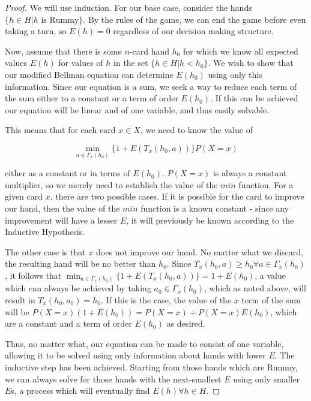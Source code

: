 \documentclass[letter,12pt]{article}
\begin{document}
\begin{proof}
We will use induction. For our base case, consider the hands $\{h \in H | h \textrm{ is Rummy}\}$. By the rules of the game, we can end the game before even taking a turn, so $E(h) = 0$ regardless of our decision making structure.

Now, assume that there is some $n$-card hand $h_0$ for which we know all expected values $E(h)$ for values of $h$ in the set $\{h \in H | h < h_0\}$. We wish to show that our modified Bellman equation can determine $E(h_0)$ using only this information. Since our equation is a sum, we seek a way to reduce each term of the sum either to a constant or a term of order $E(h_0)$. If this can be achieved our equation will be linear and of one variable, and thus easily solvable.

This means that for each card $x \in X$, we need to know the value of 

$$\min_{a \in \Gamma_x (h_0)}\{1+E(T_x(h_0,a))\} P(X=x)$$

either as a constant or in terms of $E(h_0)$. $P(X=x)$ is always a constant multiplier, so we merely need to establish the value of the $min$ function. For a given card $x$, there are two possible cases. If it is possible for the card to improve our hand, then the value of the $min$ function is a known constant - since any improvement will have a lesser $E$, it will previously be known according to the Inductive Hypothesis.

The other case is that $x$ does not improve our hand. No matter what we discard, the resulting hand will be no better than $h_0$. Since $T_x(h_0,a) \geq h_0 \forall a \in \Gamma_x (h_0)$, it follows that $\min_{a \in \Gamma_x (h_0)}\{1+E(T_x(h_0,a))\} = 1 + E(h_0)$, a value which can always be achieved by taking $a_0 \in  \Gamma_x (h_0)$, which as noted above, will result in $T_x(h_0,a_0)=h_0$. If this is the case, the value of the $x$ term of the sum will be $P(X=x)(1+E(h_0)) = P(X=x) + P(X=x)E(h_0)$, which are a constant and a term of order $E(h_0)$ as desired.

Thus, no matter what, our equation can be made to consist of one variable, allowing it to be solved using only information about hands with lower $E$. The inductive step has been achieved. Starting from those hands which are Rummy, we can always solve for those hands with the next-smallest $E$ using only smaller $E$s, a process which will eventually find $E(h) \forall h \in H$.
\end{proof}
\end{document}

